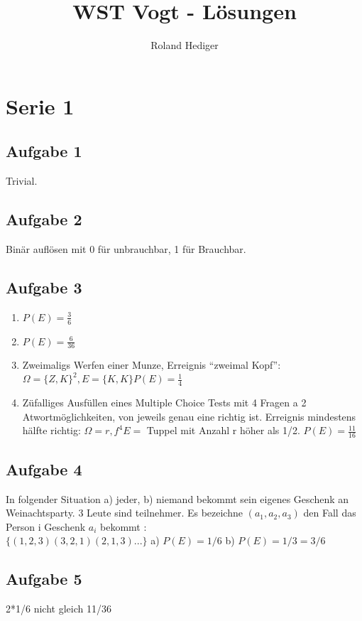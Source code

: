 \documentclass[a4paper,10pt]{scrbook}
\title{WST Vogt - Lösungen}
\author{Roland Hediger}
\begin{document}
\maketitle
\pagestyle{fancy}
\chapter*{Serie 1}

\section*{Aufgabe 1}
Trivial.
\section*{Aufgabe 2}
Binär auflösen mit 0 für unbrauchbar, 1 für Brauchbar.

\section*{Aufgabe 3}
\begin{enumerate}
 \item $P(E) = \frac{3}{6}$
 \item $P(E) = \frac{6}{36}$
 \item Zweimaligs Werfen einer Munze, Erreignis ``zweimal Kopf'': \\
 $ \Omega = \{Z,K\}^2 , E = \{K,K\} P(E) = \frac{1}{4}$
 \item Züfalliges Ausfüllen eines Multiple Choice Tests mit 4 Fragen a 2 Atwortmöglichkeiten, von jeweils genau eine 
richtig ist. Erreignis mindestens hälfte richtig:
$\Omega = {r,f}^4 E=$ Tuppel mit Anzahl r höher als 1/2. $P(E) = \frac{11}{16}$
\end{enumerate}

\section*{Aufgabe 4}
In folgender Situation a) jeder, b) niemand bekommt sein eigenes Geschenk an Weinachtsparty. 3 Leute sind teilnehmer.
Es bezeichne $(a_1,a_2,a_3)$ den Fall das Person i Geschenk $a_i$ bekommt : \\
$\{(1,2,3)(3,2,1)(2,1,3)...\}$
a) $P(E) = 1/6$
b) $P(E) = 1/3 = 3/6$

\section*{Aufgabe 5} 
2*1/6 nicht gleich 11/36
\end{document}
